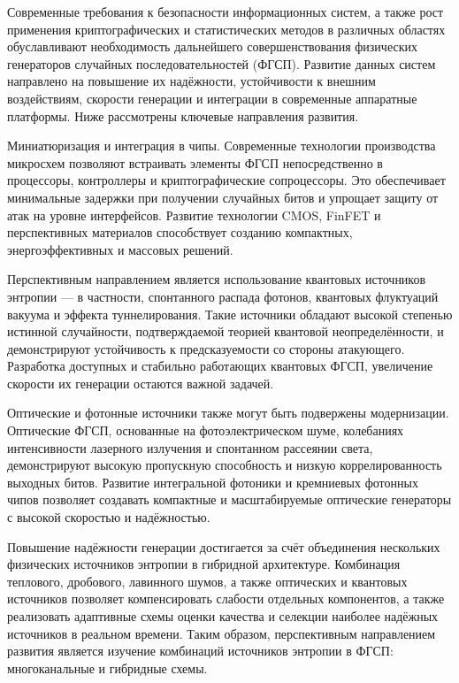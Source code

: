 
Современные требования к безопасности информационных систем, а также
рост применения криптографических и статистических методов в различных
областях обуславливают необходимость дальнейшего совершенствования
физических генераторов случайных последовательностей (ФГСП). Развитие
данных систем направлено на повышение их надёжности, устойчивости к
внешним воздействиям, скорости генерации и интеграции в современные
аппаратные платформы. Ниже рассмотрены ключевые направления развития.

Миниатюризация и интеграция в чипы. Современные технологии производства
микросхем позволяют встраивать элементы ФГСП непосредственно в
процессоры, контроллеры и криптографические сопроцессоры. Это
обеспечивает минимальные задержки при получении случайных битов и
упрощает защиту от атак на уровне интерфейсов. Развитие технологии CMOS,
FinFET и перспективных материалов способствует созданию компактных,
энергоэффективных и массовых решений.

Перспективным направлением является использование квантовых источников
энтропии --- в частности, спонтанного распада фотонов, квантовых
флуктуаций вакуума и эффекта туннелирования. Такие источники обладают
высокой степенью истинной случайности, подтверждаемой теорией квантовой
неопределённости, и демонстрируют устойчивость к предсказуемости со
стороны атакующего. Разработка доступных и стабильно работающих
квантовых ФГСП, увеличение скорости их генерации остаются важной
задачей.

Оптические и фотонные источники также могут быть подвержены
модернизации. Оптические ФГСП, основанные на фотоэлектрическом шуме,
колебаниях интенсивности лазерного излучения и спонтанном рассеянии
света, демонстрируют высокую пропускную способность и низкую
коррелированность выходных битов. Развитие интегральной фотоники и
кремниевых фотонных чипов позволяет создавать компактные и
масштабируемые оптические генераторы с высокой скоростью и надёжностью.

Повышение надёжности генерации достигается за счёт объединения
нескольких физических источников энтропии в гибридной архитектуре.
Комбинация теплового, дробового, лавинного шумов, а также оптических и
квантовых источников позволяет компенсировать слабости отдельных
компонентов, а также реализовать адаптивные схемы оценки качества и
селекции наиболее надёжных источников в реальном времени. Таким образом,
перспективным направлением развития является изучение комбинаций
источников энтропии в ФГСП: многоканальные и гибридные схемы.

